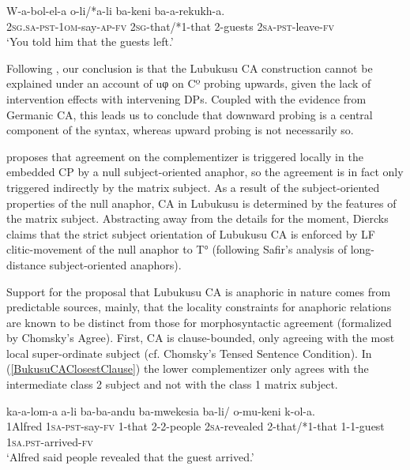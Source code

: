 \documentclass[output=paper
,modfonts
,nonflat
]{langsci/langscibook}
\begin{document}
\ea \label{IndirectObject=Obj}
\gll W-a-bol-el-a o-li/*a-li ba-keni ba-a-rekukh-a. \\
2\textsc{sg}.\textsc{sa}-\textsc{pst}-1\textsc{om}-say-\textsc{ap}-\textsc{fv} {2\textsc{sg}-that/*1-that} 2-guests 2\textsc{sa}-\textsc{pst}-leave-\textsc{fv} \\
\glt `You told him that the guests left.'
\z

Following \citet{Diercks:2013}, our conclusion is that the Lubukusu CA construction cannot be explained under an account of uφ on Cº probing upwards, given the lack of intervention effects with intervening DPs. Coupled with the evidence from Germanic CA, this leads us to conclude that downward probing is a central component of the syntax, whereas upward probing is not necessarily so.  

\citet{Diercks:2013} proposes that agreement on the complementizer is triggered locally in the embedded CP by a null subject-oriented anaphor, so the agreement is in fact only triggered indirectly by the matrix subject. As a result of the subject-oriented properties of the null anaphor, CA in Lubukusu is determined by the features of the matrix subject. Abstracting away from the details for the moment, Diercks claims that the strict subject orientation of Lubukusu CA is enforced by LF clitic-movement of the null anaphor to T° (following Safir’s \citeyear{Safir:2004} analysis of long-distance subject-oriented anaphors). 

Support for the proposal that Lubukusu CA is anaphoric in nature comes from predictable sources, mainly, that the locality constraints for anaphoric relations are known to be distinct from those for morphosyntactic agreement (formalized by Chomsky’s \citeyear{Chomsky:2001a} Agree). First, CA is clause-bounded, only agreeing with the most local super-ordinate subject (cf. Chomsky’s \citeyear{Chomsky:1973} Tensed Sentence Condition). In (\ref{BukusuCAClosestClause}) the lower complementizer only agrees with the intermediate class 2 subject and not with the class 1 matrix subject.

\ea \label{BukusuCAClosestClause}
\gll {} ka-a-lom-a a-li ba-ba-andu ba-mwekesia ba-li/ o-mu-keni k-ol-a. \\
1Alfred 1\textsc{sa}-\textsc{pst}-say-\textsc{fv} 1-that 2-2-people 2\textsc{sa}-revealed {2-that/*1-that} 1-1-guest 1\textsc{sa}.\textsc{pst}-arrived-\textsc{fv} \\
\glt `Alfred said people revealed that the guest arrived.'
\z
\end{document}
